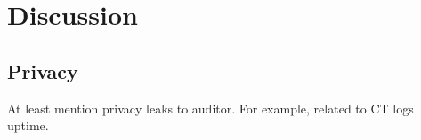 \section{Discussion} \label{sec:discussion}

\subsection{Privacy}
At least mention privacy leaks to auditor. For example, related to CT logs uptime.